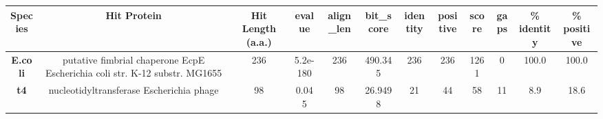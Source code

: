 \begin{tabular}{|c|c|c|c|c|c|c|c|c|c|c|c|} \hline
\textbf{Species} & \textbf{Hit Protein} & \textbf{Hit Length (a.a.)} & \textbf{evalue} & \textbf{align\_len} & \textbf{bit\_score} & \textbf{identity} & \textbf{positive} & \textbf{score} & \textbf{gaps} & \textbf{\% identity} & \textbf{\% positive} \\ \hline
\textbf{E.coli} & putative fimbrial chaperone EcpE Escherichia coli str. K-12 substr. MG1655 & 236 & 5.2e-180 & 236 & 490.345 & 236 & 236 & 1261 & 0 & 100.0 & 100.0\\
\textbf{t4} & nucleotidyltransferase Escherichia phage  & 98 & 0.045 & 98 & 26.9498 & 21 & 44 & 58 & 11 & 8.9 & 18.6\\
\hline \end{tabular}
